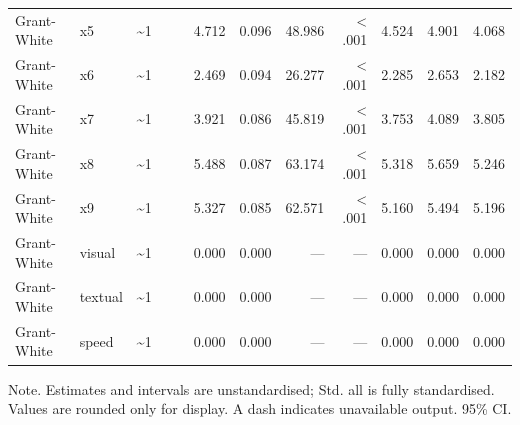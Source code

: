 \documentclass[11pt]{article}
\begin{document}
\begin{landscape}
\begin{longtable}{llllrrrrrrrr}
Grant-White & x5 & \textasciitilde{}1 &  &  & 4.712 & 0.096 & 48.986 & < .001 & 4.524 & 4.901 & 4.068 \\
Grant-White & x6 & \textasciitilde{}1 &  &  & 2.469 & 0.094 & 26.277 & < .001 & 2.285 & 2.653 & 2.182 \\
Grant-White & x7 & \textasciitilde{}1 &  &  & 3.921 & 0.086 & 45.819 & < .001 & 3.753 & 4.089 & 3.805 \\
Grant-White & x8 & \textasciitilde{}1 &  &  & 5.488 & 0.087 & 63.174 & < .001 & 5.318 & 5.659 & 5.246 \\
Grant-White & x9 & \textasciitilde{}1 &  &  & 5.327 & 0.085 & 62.571 & < .001 & 5.160 & 5.494 & 5.196 \\
Grant-White & visual & \textasciitilde{}1 &  &  & 0.000 & 0.000 & — & — & 0.000 & 0.000 & 0.000 \\
Grant-White & textual & \textasciitilde{}1 &  &  & 0.000 & 0.000 & — & — & 0.000 & 0.000 & 0.000 \\
Grant-White & speed & \textasciitilde{}1 &  &  & 0.000 & 0.000 & — & — & 0.000 & 0.000 & 0.000 \\
\bottomrule
\end{longtable}
\noindent Note. Estimates and intervals are unstandardised; Std. all is fully standardised. Values are rounded only for display. A dash indicates unavailable output. 95\% CI. \par
\end{landscape}
\end{document}
